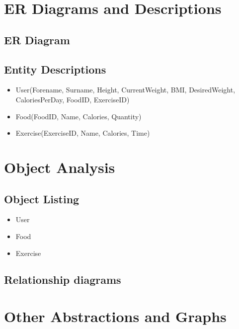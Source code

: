 
\section{ER Diagrams and Descriptions}

\subsection{ER Diagram}

\subsection{Entity Descriptions}

\begin{itemize}
\item User(Forename, Surname, Height, CurrentWeight, BMI, DesiredWeight, CaloriesPerDay, FoodID, ExerciseID)
\item Food(FoodID, Name, Calories, Quantity)
\item Exercise(ExerciseID, Name, Calories, Time)
\end{itemize}

\section{Object Analysis}

\subsection{Object Listing}

\begin{itemize}
\item User
\item Food
\item Exercise
\end{itemize}

\subsection{Relationship diagrams}

\section{Other Abstractions and Graphs}

